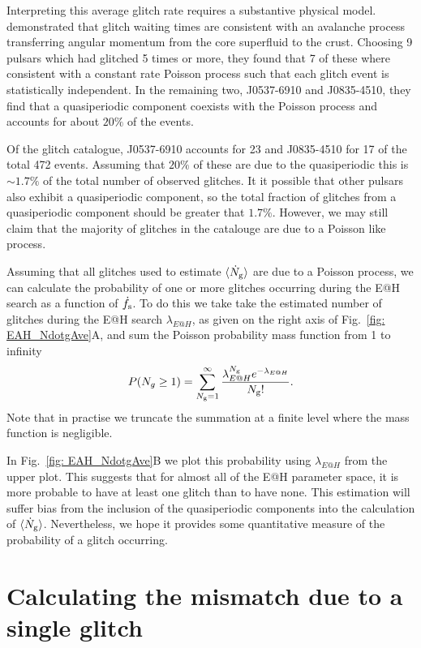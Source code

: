 \documentclass[../full_thesis/full_thesis.tex]{subfiles}
\begin{document}
Interpreting this average glitch rate requires a substantive physical
model. \citet{Melatos2008} demonstrated that glitch waiting times are consistent
with an avalanche process transferring angular momentum from the core superfluid
to the crust. Choosing 9 pulsars which had glitched 5 times or more, they found
that 7 of these where consistent with a constant rate Poisson process such that
each glitch event is statistically independent. In the remaining two, J0537-6910
and J0835-4510, they find that a quasiperiodic component coexists with the Poisson
process and accounts for about $20\%$ of the events.

Of the glitch catalogue, J0537-6910 accounts for 23 and J0835-4510 for 17 of
the total 472 events. Assuming that $20\%$ of these are due to the
quasiperiodic this is $\sim 1.7\%$ of the total number of observed glitches. It
it possible that other pulsars also exhibit a quasiperiodic component, so the
total fraction of glitches from a quasiperiodic component should be greater
that $1.7\%$. However, we may still claim that the majority of glitches in the
catalouge are due to a Poisson like process.

Assuming that all glitches used to estimate $\langle \dot{N}_{\textrm{g}}\rangle$ are due to a Poisson
process, we can calculate the probability of one or more glitches occurring during
the E@H search as a function of $\dot{f}_{\textrm{s}}$. To do this we take take the
estimated number of glitches during the E@H search
$\lambda_{E@H}$, as given on the right axis of Fig.~\ref{fig: EAH_NdotgAve}A,
and sum the Poisson probability mass function from 1 to infinity
\begin{align}
P(N_{g} \ge 1) = \sum_{N_{\textrm{g}}=1}^{\infty}\frac{\lambda_{E@H}^{N_{\textrm{g}}}e^{-\lambda_{E@H}}}{N_{\textrm{g}}!}.
\end{align}
Note that in practise we truncate the summation at a finite level where the
mass function is negligible.

In Fig.~\ref{fig: EAH_NdotgAve}B we plot this probability
using $\lambda_{E@H}$ from the upper plot. This suggests that for almost all of
the E@H parameter space, it is more probable to have at least one glitch than
to have none. This estimation will suffer bias from the inclusion of the
quasiperiodic components into the calculation of $\langle \dot{N}_{\textrm{g}}\rangle$. Nevertheless, we
hope it provides some quantitative measure of the probability of a glitch occurring.

\section{Calculating the mismatch due to a single glitch}
\label{sec: mismatch due to glitches}
\end{document}
